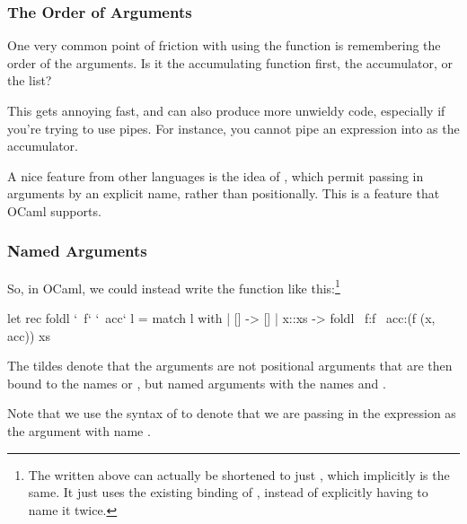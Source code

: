 \documentclass[aspectratio=169, handout]{beamer}
\begin{document}
\begin{frame}[fragile]
  \frametitle{The Order of Arguments}

  One very common point of friction with using the  function is
  remembering the order of the arguments. Is it the accumulating function first,
  the accumulator, or the list?

  \vspace{\fill}

  This gets annoying fast, and can also produce more unwieldy code, especially
  if you're trying to use pipes. For instance, you cannot pipe an expression into
   as the accumulator.

  \vspace{\fill}

  A nice feature from other languages is the idea of ,
  which permit passing in arguments by an explicit name, rather than positionally.
  This is a feature that OCaml supports.
\end{frame}

\begin{frame}[fragile]
  \frametitle{Named Arguments}

  So, in OCaml, we could instead write the  function like this:\footnote{
    The  written above can actually be shortened to just
    , which implicitly is the same. It just uses the existing binding
    of , instead of explicitly having to name it twice.
  }

  \vspace{\fill}

  \begin{codeblock}
    let rec foldl `~f` `~acc` l =
      match l with
      | [] -> []
      | x::xs ->
          foldl ~f:f ~acc:(f (x, acc)) xs
  \end{codeblock}

  \vspace{\fill}

  The tildes denote that the arguments are not positional arguments
  that are then bound to the names  or , but named arguments
  with the names  and .

  \vspace{\fill}

  Note that we use the syntax of  to denote that we are
  passing in the expression  as the argument with name .

\end{frame}
\end{document}
